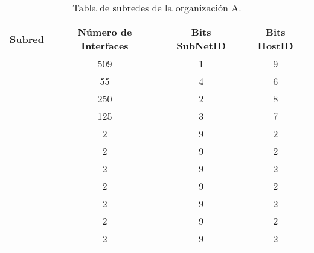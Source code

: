 \begin{table}[H]
    \centering
    \begin{tabular}{|c|c|c|c|}
        \hline
       	Subred&Número de Interfaces&Bits SubNetID&Bits HostID\\\hline
	\cellcolor{azul}{LAN1.0}&509&1&9 \\ \hline
	\cellcolor{naranja}{LAN1.1}&55&4&6 \\ \hline
	\cellcolor{lila}{LAN1.2}&250&2&8 \\ \hline
	\cellcolor{rosa}{LAN1.3}&125&3&7 \\ \hline
	\cellcolor{verde}{P2P1.0}&2&9&2 \\ \hline
	\cellcolor{verde}{P2P1.1}&2&9&2 \\ \hline
	\cellcolor{verde}{P2P1.2}&2&9&2 \\ \hline
	\cellcolor{verde}{P2P1.3}&2&9&2 \\ \hline
	\cellcolor{verde}{P2P1.4}&2&9&2 \\ \hline
	\cellcolor{verde}{P2P1.5}&2&9&2 \\ \hline
	\cellcolor{verde}{P2P1.6}&2&9&2 \\ \hline
    \end{tabular}
    \caption{Tabla de subredes de la organización A.}
    \label{tab:orgA.1}
\end{table}

